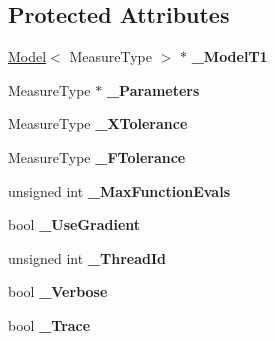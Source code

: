 \subsection*{Protected Attributes}
\begin{DoxyCompactItemize}
\item 
\hypertarget{class_ox_1_1_fitter_abe055a1231bcc600f387f34194d7fc0e}{\hyperlink{class_ox_1_1_model}{Model}$<$ Measure\-Type $>$ $\ast$ {\bfseries \-\_\-\-Model\-T1}}\label{class_ox_1_1_fitter_abe055a1231bcc600f387f34194d7fc0e}

\item 
\hypertarget{class_ox_1_1_fitter_a508e5654aaf79dd744ec816d95b7e33c}{Measure\-Type $\ast$ {\bfseries \-\_\-\-Parameters}}\label{class_ox_1_1_fitter_a508e5654aaf79dd744ec816d95b7e33c}

\item 
\hypertarget{class_ox_1_1_fitter_af91a5ea8fb20072277ddcd64f5537b09}{Measure\-Type {\bfseries \-\_\-\-X\-Tolerance}}\label{class_ox_1_1_fitter_af91a5ea8fb20072277ddcd64f5537b09}

\item 
\hypertarget{class_ox_1_1_fitter_a926f6cf38998f041c31b079e93bf27ab}{Measure\-Type {\bfseries \-\_\-\-F\-Tolerance}}\label{class_ox_1_1_fitter_a926f6cf38998f041c31b079e93bf27ab}

\item 
\hypertarget{class_ox_1_1_fitter_a3be7ea1c1f19d3f4fb384474e2b1a033}{unsigned int {\bfseries \-\_\-\-Max\-Function\-Evals}}\label{class_ox_1_1_fitter_a3be7ea1c1f19d3f4fb384474e2b1a033}

\item 
\hypertarget{class_ox_1_1_fitter_a34c039e87d52c28b19092535a171264f}{bool {\bfseries \-\_\-\-Use\-Gradient}}\label{class_ox_1_1_fitter_a34c039e87d52c28b19092535a171264f}

\item 
\hypertarget{class_ox_1_1_fitter_a0d97d7a9c9fad0349484151464fefe4f}{unsigned int {\bfseries \-\_\-\-Thread\-Id}}\label{class_ox_1_1_fitter_a0d97d7a9c9fad0349484151464fefe4f}

\item 
\hypertarget{class_ox_1_1_fitter_a6457339f5252c85d7c92f20439544975}{bool {\bfseries \-\_\-\-Verbose}}\label{class_ox_1_1_fitter_a6457339f5252c85d7c92f20439544975}

\item 
\hypertarget{class_ox_1_1_fitter_a9ba79cb05ecc670254b3e7ddafc519ab}{bool {\bfseries \-\_\-\-Trace}}\label{class_ox_1_1_fitter_a9ba79cb05ecc670254b3e7ddafc519ab}

\end{DoxyCompactItemize}


